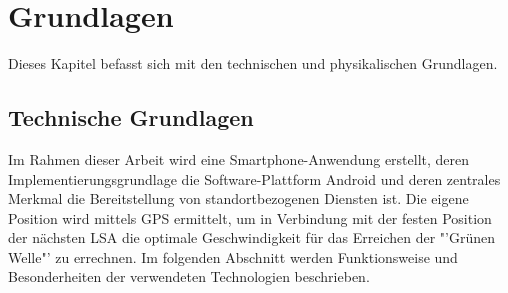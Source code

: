 \chapter{\label{chap:grundlagen}Grundlagen}
Dieses Kapitel befasst sich mit den technischen und physikalischen Grundlagen.  
\section{\label{sec:technGrundlagen}Technische Grundlagen}
Im Rahmen dieser Arbeit wird eine \gls{Smartphone}-Anwendung erstellt, deren Implementierungsgrundlage die Software-Plattform Android und deren zentrales Merkmal die Bereitstellung von standortbezogenen Diensten ist. Die eigene Position wird mittels \gls{GPS} ermittelt, um in Verbindung mit der festen Position der nächsten \gls{LSA} die optimale Geschwindigkeit für das Erreichen der "'Grünen Welle"' zu errechnen. Im folgenden Abschnitt werden Funktionsweise und Besonderheiten der verwendeten Technologien beschrieben. 
